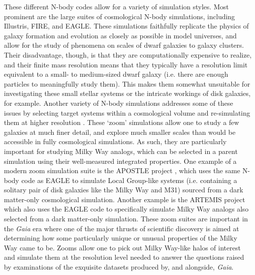 These different N-body codes allow for a variety of simulation styles. Most prominent are the large suites of cosmological N-body simulations, including Illustris, FIRE, and EAGLE. These simulations faithfully replicate the physics of galaxy formation and evolution as closely as possible in model universes, and allow for the study of phenomena on scales of dwarf galaxies to galaxy clusters. Their disadvantage, though, is that they are computationally expensive to realize, and their finite mass resolution means that they typically have a resolution limit equivalent to a small- to medium-sized dwarf galaxy (i.e. there are enough particles to meaningfully study them). This makes them somewhat unsuitable for investigating these small stellar systems or the intricate workings of disk galaxies, for example. Another variety of N-body simulations addresses some of these issues by selecting target systems within a cosmological volume and re-simulating them at higher resolution \parencite[i.e. by upsampling the initial conditions, see ][]{bertschinger01,jenkins10}. These `zoom' simulations allow one to study a few galaxies at much finer detail, and explore much smaller scales than would be accessible in fully cosmological simulations. As such, they are particularly important for studying Milky Way analogs, which can be selected in a parent simulation using their well-measured integrated properties. One example of a modern zoom simulation suite is the APOSTLE project \parencite{apostle_sawala16}, which uses the same N-body code as EAGLE to simulate Local Group-like systems (i.e. containing a solitary pair of disk galaxies like the Milky Way and M31) sourced from a dark matter-only cosmological simulation. Another example is the ARTEMIS project \parencite{font20} which also uses the EAGLE code to specifically simulate Milky Way analogs also selected from a dark matter-only simulation. These zoom suites are important in the \textit{Gaia} era where one of the major thrusts of scientific discovery is aimed at determining how some particularly unique or unusual properties of the Milky Way came to be. Zooms allow one to pick out Milky Way-like halos of interest and simulate them at the resolution level needed to answer the questions raised by examinations of the exquisite datasets produced by, and alongside, \textit{Gaia}.


